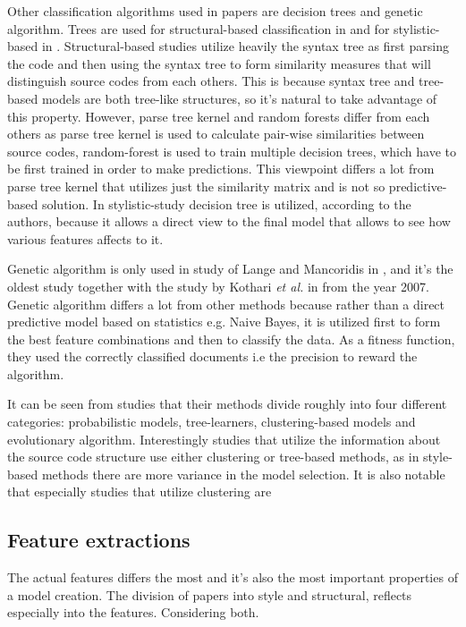 \documentclass[english]{tktltiki2}
\theoremstyle{definition}
\theoremstyle{remark}
\begin{document}
Other classification algorithms used in papers are decision trees and genetic algorithm. Trees are used for structural-based classification in \cite{Son:2013:APS:2508269.2508323, caliskan2015anonymizing} and for stylistic-based in \cite{Elenbogen:2008:DOS:1295109.1295123}. Structural-based studies utilize heavily the syntax tree as first parsing the code and then using the syntax tree to form similarity measures that will distinguish source codes from each others. This is because syntax tree and tree-based models are both tree-like structures, so it's natural to take advantage of this property. However, parse tree kernel and random forests differ from each others as parse tree kernel is used to calculate pair-wise similarities between source codes, random-forest is used to train multiple decision trees, which have to be first trained in order to make predictions. This viewpoint differs a lot from parse tree kernel that utilizes just the similarity matrix and is not so predictive-based solution. In stylistic-study decision tree is utilized, according to the authors, because it allows a direct view to the final model that allows to see how various features affects to it. 

Genetic algorithm is only used in study of Lange and Mancoridis in \cite{lange2007using}, and it's the oldest study together with the study by Kothari \textit{et al.} in \cite{kothari2007probabilistic} from the year 2007. Genetic algorithm differs a lot from other methods because rather than a direct predictive model based on statistics e.g. Naive Bayes, it is utilized first to form the best feature combinations and then to classify the data. As a fitness function, they used the correctly classified documents i.e the precision to reward the algorithm.

It can be seen from studies that their methods divide roughly into four different categories: probabilistic models, tree-learners, clustering-based models and evolutionary algorithm. Interestingly studies that utilize the information about the source code structure use either clustering or tree-based methods, as in style-based methods there are more variance in the model selection. It is also notable that especially studies that utilize clustering are 


\subsection{Feature extractions}

The actual features differs the most and it's also the most important properties of a model creation. The division of papers into style and structural, reflects especially into the features. Considering both. 
\end{document}
